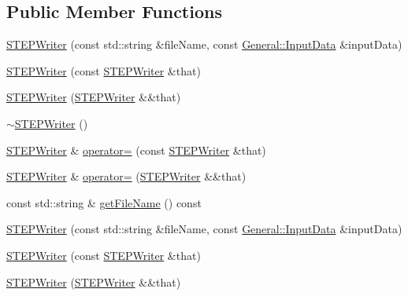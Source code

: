 \subsection*{Public Member Functions}
\begin{DoxyCompactItemize}
\item 
\hyperlink{classMcCAD_1_1IO_1_1STEPWriter_a3013407d8ffe55a75e1aa6797cd0d2ea}{S\+T\+E\+P\+Writer} (const std\+::string \&file\+Name, const \hyperlink{classMcCAD_1_1General_1_1InputData}{General\+::\+Input\+Data} \&input\+Data)
\item 
\hyperlink{classMcCAD_1_1IO_1_1STEPWriter_a94aa76a6d70bb8b0c257481f8ecef176}{S\+T\+E\+P\+Writer} (const \hyperlink{classMcCAD_1_1IO_1_1STEPWriter}{S\+T\+E\+P\+Writer} \&that)
\item 
\hyperlink{classMcCAD_1_1IO_1_1STEPWriter_a4afb3cf439afc5dced54779ccf323520}{S\+T\+E\+P\+Writer} (\hyperlink{classMcCAD_1_1IO_1_1STEPWriter}{S\+T\+E\+P\+Writer} \&\&that)
\item 
\hyperlink{classMcCAD_1_1IO_1_1STEPWriter_a50066bad641148a65641ddb4ac21c07d}{$\sim$\+S\+T\+E\+P\+Writer} ()
\item 
\hyperlink{classMcCAD_1_1IO_1_1STEPWriter}{S\+T\+E\+P\+Writer} \& \hyperlink{classMcCAD_1_1IO_1_1STEPWriter_ad1ce0928642a6720e0bac03b2fca5ed1}{operator=} (const \hyperlink{classMcCAD_1_1IO_1_1STEPWriter}{S\+T\+E\+P\+Writer} \&that)
\item 
\hyperlink{classMcCAD_1_1IO_1_1STEPWriter}{S\+T\+E\+P\+Writer} \& \hyperlink{classMcCAD_1_1IO_1_1STEPWriter_a6a56e30321cc7bde325ffa4d34f64b55}{operator=} (\hyperlink{classMcCAD_1_1IO_1_1STEPWriter}{S\+T\+E\+P\+Writer} \&\&that)
\item 
const std\+::string \& \hyperlink{classMcCAD_1_1IO_1_1STEPWriter_aa7c834b61e77c32e818f84785d84ec24}{get\+File\+Name} () const
\item 
\hyperlink{classMcCAD_1_1IO_1_1STEPWriter_a3013407d8ffe55a75e1aa6797cd0d2ea}{S\+T\+E\+P\+Writer} (const std\+::string \&file\+Name, const \hyperlink{classMcCAD_1_1General_1_1InputData}{General\+::\+Input\+Data} \&input\+Data)
\item 
\hyperlink{classMcCAD_1_1IO_1_1STEPWriter_a94aa76a6d70bb8b0c257481f8ecef176}{S\+T\+E\+P\+Writer} (const \hyperlink{classMcCAD_1_1IO_1_1STEPWriter}{S\+T\+E\+P\+Writer} \&that)
\item 
\hyperlink{classMcCAD_1_1IO_1_1STEPWriter_a4afb3cf439afc5dced54779ccf323520}{S\+T\+E\+P\+Writer} (\hyperlink{classMcCAD_1_1IO_1_1STEPWriter}{S\+T\+E\+P\+Writer} \&\&that)
\item 

\end{DoxyCompactItemize}
